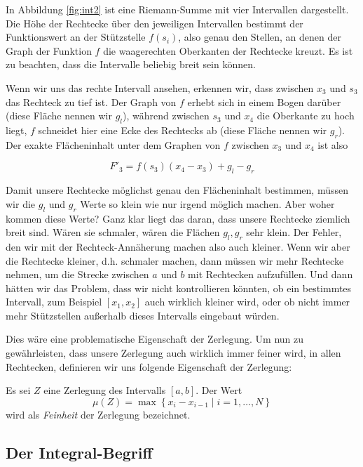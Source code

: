 In Abbildung \ref{fig:int2} ist eine Riemann-Summe mit vier Intervallen dargestellt. Die Höhe der Rechtecke über den jeweiligen Intervallen bestimmt der Funktionswert an der Stützstelle $f(s_i)$, also genau den Stellen, an denen der Graph der Funktion $f$ die waagerechten Oberkanten der Rechtecke kreuzt. Es ist zu beachten, dass die Intervalle beliebig breit sein können.

Wenn wir uns das rechte Intervall ansehen, erkennen wir, dass zwischen $x_3$ und $s_3$ das Rechteck zu tief ist. Der Graph von $f$ erhebt sich in einem Bogen darüber (diese Fläche nennen wir $g_l$), während zwischen $s_3$ und $x_4$ die Oberkante zu hoch liegt, $f$ schneidet hier eine Ecke des Rechtecks ab (diese Fläche nennen wir $g_r$). Der exakte Flächeninhalt unter dem Graphen von $f$ zwischen $x_3$ und $x_4$ ist also

\begin{equation}
F'_3 = f(s_3)(x_4-x_3)+g_l-g_r
\end{equation}

Damit unsere Rechtecke möglichst genau den Flächeninhalt bestimmen, müssen wir die $g_l$ und $g_r$ Werte so klein wie nur irgend möglich machen. Aber woher kommen diese Werte? Ganz klar liegt das daran, dass unsere Rechtecke ziemlich breit sind. Wären sie schmaler, wären die Flächen $g_l,g_r$ sehr klein. Der Fehler, den wir mit der Rechteck-Annäherung machen also auch kleiner. Wenn wir aber die Rechtecke kleiner, d.h. schmaler machen, dann müssen wir mehr Rechtecke nehmen, um die Strecke zwischen $a$ und $b$ mit Rechtecken aufzufüllen. Und dann hätten wir das Problem, dass wir nicht kontrollieren könnten, ob ein bestimmtes Intervall, zum Beispiel $[x_1,x_2]$ auch wirklich kleiner wird, oder ob nicht immer mehr Stützstellen außerhalb dieses Intervalls eingebaut würden. 

Dies wäre eine problematische Eigenschaft der Zerlegung. Um nun zu gewährleisten, dass unsere Zerlegung auch wirklich immer feiner wird, in allen Rechtecken, definieren wir uns folgende Eigenschaft der Zerlegung:

\begin{definition}
Es sei $Z$ eine Zerlegung des Intervalls $[a,b]$. Der Wert
\begin{equation}
\mu (Z) = \max\left\{ x_{i}-x_{i-1} \middle| i=1,\dots ,N  \right\}
\end{equation}
wird als \emph{Feinheit} der Zerlegung bezeichnet.
\end{definition}

\subsection{Der Integral-Begriff}

